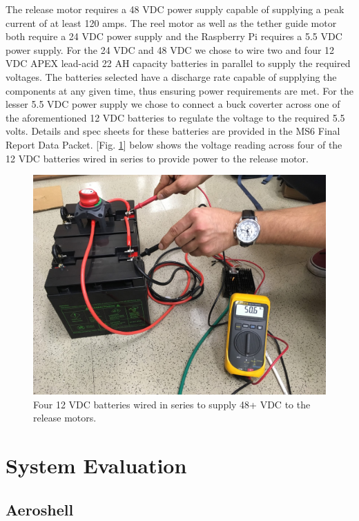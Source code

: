 The release motor requires a 48 VDC power supply capable of supplying a peak current of at least 120 amps. The reel motor as well as the tether guide motor both require a 24 VDC power supply and the Raspberry Pi requires a 5.5 VDC power supply. For the 24 VDC and 48 VDC we chose to wire two and four 12 VDC APEX lead-acid 22 AH capacity batteries in parallel to supply the required voltages. The batteries selected have a discharge rate capable of supplying the components at any given time, thus ensuring power requirements are met. For the lesser 5.5 VDC power supply we chose to connect a buck coverter across one of the aforementioned 12 VDC batteries to regulate the voltage to the required 5.5 volts. Details and spec sheets for these batteries are provided in the MS6 Final Report Data Packet. [Fig. \ref{fig:RealPower}] below shows the voltage reading across four of the 12 VDC batteries wired in series to provide power to the release motor. 

\begin{figure}[ht]
  \centering
  \includegraphics[width=.8\textwidth]{TUMBR/RealPower.JPG}
  \caption{\label{fig:RealPower} Four 12 VDC batteries wired in series to supply 48+ VDC to the release motors.}
\end{figure}


\section{System Evaluation}

\subsection{Aeroshell}

